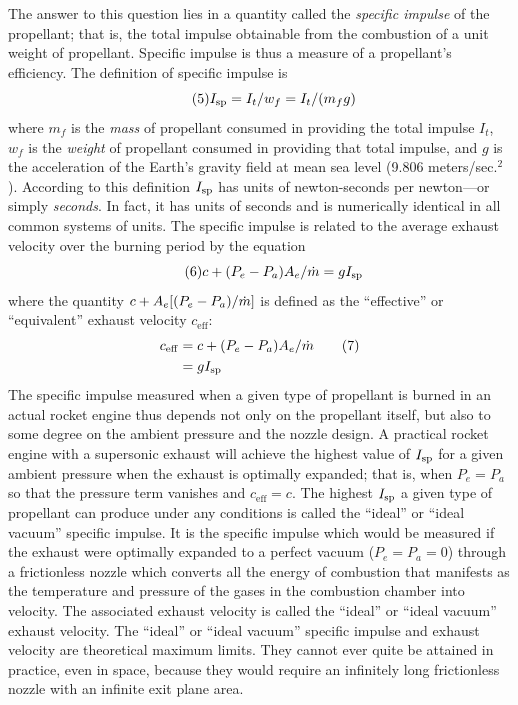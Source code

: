 \noindent The answer to this question lies in a quantity called the \emph{specific impulse} of the
propellant; that is, the total impulse obtainable from the combustion of a unit weight of propellant.
Specific impulse is thus a measure of a propellant's efficiency. The definition of specific impulse is
\begin{equation*}\tag{5}
I_{\mathrm{sp}} = I_t/w_f = I_t/(m_f g)
\end{equation*}
where $m_f$ is the \emph{mass} of propellant consumed in providing the total impulse $I_t$, $w_f$ is the
\emph{weight} of propellant consumed in providing that total impulse, and $g$ is the acceleration of the
Earth's gravity field at mean sea level (9.806 meters/sec.$^{2}$). According to this definition $I_{\mathrm{sp}}$ has
units of newton-seconds per newton---or simply \emph{seconds}. In fact, it has units of seconds and is
numerically identical in all common systems of units. The specific impulse is related to the average
exhaust velocity over the burning period by the equation
\begin{equation*}\tag{6}
c + (P_e - P_a)A_e/\dot{m} = gI_{\mathrm{sp}}
\end{equation*}
where the quantity $c + A_e[(P_e - P_a)/\dot{m}]$ is defined as the ``effective'' or ``equivalent'' exhaust
velocity $c_{\mathrm{eff}}$:
\begin{align*}
c_{\mathrm{eff}} &= c + (P_e - P_a)A_e/\dot{m} \tag{7}\\
&= gI_{\mathrm{sp}}
\end{align*}
The specific impulse measured when a given type of propellant is burned in an actual rocket engine thus
depends not only on the propellant itself, but also to some degree on the ambient pressure and the nozzle
design. A practical rocket engine with a supersonic exhaust will achieve the highest value of $I_{\mathrm{sp}}$ for a
given ambient pressure when the exhaust is optimally expanded; that is, when $P_e = P_a$ so that the pressure
term vanishes and $c_{\mathrm{eff}} = c$. The highest $I_{\mathrm{sp}}$ a given type of propellant can produce under any
conditions is called the ``ideal'' or ``ideal vacuum'' specific impulse. It is the specific impulse which
would be measured if the exhaust were optimally expanded to a perfect vacuum ($P_e = P_a = 0$) through a
frictionless nozzle which converts all the energy of combustion that manifests as the temperature and
pressure of the gases in the combustion chamber into velocity. The associated exhaust velocity is called the
``ideal'' or ``ideal vacuum'' exhaust velocity. The ``ideal'' or ``ideal vacuum'' specific impulse and
exhaust velocity are theoretical maximum limits. They cannot ever quite be attained in practice, even in
space, because they would require an infinitely long frictionless nozzle with an infinite exit plane area.


